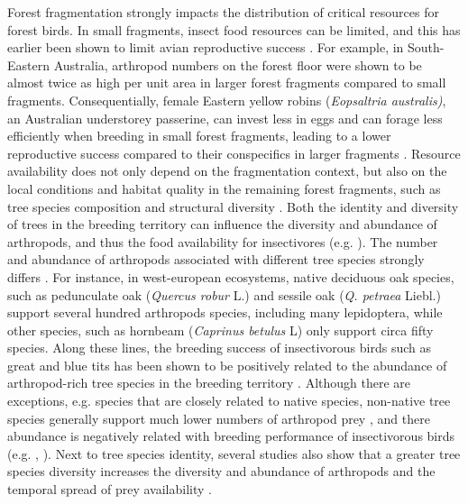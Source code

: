 \documentclass[10pt, twoside]{book} %
\begin{document}
Forest fragmentation strongly impacts the distribution of critical resources for forest birds. In small fragments, insect food resources can be limited, and this has earlier been shown to limit avian reproductive success \citep{Robinson1998, Burke1998}. For example, in South-Eastern Australia, arthropod numbers on the forest floor were shown to be almost twice as high per unit area in larger forest fragments compared to small fragments. Consequentially, female Eastern yellow robins (\textit{Eopsaltria australis)}, an Australian understorey passerine, can invest less in eggs and can forage less efficiently when breeding in small forest fragments, leading to a lower reproductive success compared to their conspecifics in larger fragments \citep{Zanette2000}. Resource availability does not only depend on the fragmentation context, but also on the local conditions and habitat quality in the remaining forest fragments, such as tree species composition and structural diversity \citep{Mortelliti2010, Humphrey2015}. Both the identity and diversity of trees in the breeding territory can influence the diversity and abundance of arthropods, and thus the food availability for insectivores (e.g. \citealt{Shutt2018, VanSchrojensteinLantman2018}). The number and abundance of arthropods associated with different tree species strongly differs \citep{Kennedy1984, Brandle2001}. For instance, in west-european ecosystems, native deciduous oak species, such as pedunculate oak (\textit{Quercus robur} L.) and sessile oak (\textit{Q. petraea} Liebl.) support several hundred arthropods species, including many lepidoptera, while other species, such as hornbeam (\textit{Caprinus betulus} L) only support circa fifty species. Along these lines, the breeding success of insectivorous birds such as great and blue tits has been shown to be positively related to the abundance of arthropod-rich tree species in the breeding territory \citep{Wilkin2007a, Amininasab2016, Shutt2018}.  Although there are exceptions, e.g. species that are closely related to native species, non-native tree species generally support much lower numbers of arthropod prey \citep{Goßner2004}, and there abundance is negatively related with breeding performance of insectivorous birds (e.g. \citealt{Narango2017} , \citealt{Mackenzie2014}). Next to tree species identity, several studies also show that a greater tree species diversity increases the diversity and abundance of arthropods \citep{Fuentes-Montemayor2012} and the temporal spread of prey availability \citep{Kennedy1984}.\\
\end{document}
